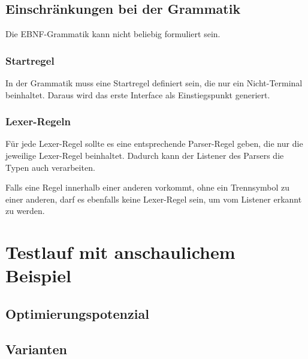 \documentclass[../InterneDSLs.tex]{subfiles}
\begin{document}
\section{Einschränkungen bei der Grammatik}
Die EBNF-Grammatik kann nicht beliebig formuliert sein.

\subsection{Startregel}
In der Grammatik muss eine Startregel definiert sein, die nur ein Nicht-Terminal beinhaltet. Daraus wird das erste Interface als Einstiegspunkt generiert.

\subsection{Lexer-Regeln}
Für jede Lexer-Regel sollte es eine entsprechende Parser-Regel geben, die nur die jeweilige Lexer-Regel beinhaltet. Dadurch kann der Listener des Parsers die Typen auch verarbeiten.

Falls eine Regel innerhalb einer anderen vorkommt, ohne ein Trennsymbol zu einer anderen, darf es ebenfalls keine Lexer-Regel sein, um vom Listener erkannt zu werden.


\chapter{Testlauf mit anschaulichem Beispiel}


\section{Optimierungspotenzial}


\section{Varianten}
\end{document}
